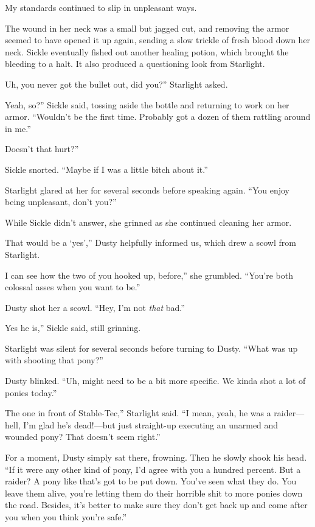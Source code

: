 My standards continued to slip in unpleasant ways.

The wound in her neck was a small but jagged cut, and removing the armor seemed to have opened it up again, sending a slow trickle of fresh blood down her neck. Sickle eventually fished out another healing potion, which brought the bleeding to a halt. It also produced a questioning look from Starlight.

\leavevmode{}Uh, you never got the bullet out, did you?” Starlight asked.

\leavevmode{}Yeah, so?” Sickle said, tossing aside the bottle and returning to work on her armor. “Wouldn’t be the first time. Probably got a dozen of them rattling around in me.”

\leavevmode{}Doesn’t that hurt?”

Sickle snorted. “Maybe if I was a little bitch about it.”

Starlight glared at her for several seconds before speaking again. “You enjoy being unpleasant, don’t you?”

While Sickle didn’t answer, she grinned as she continued cleaning her armor.

\leavevmode{}That would be a ‘yes’,” Dusty helpfully informed us, which drew a scowl from Starlight.

\leavevmode{}I can see how the two of you hooked up, before,” she grumbled. “You’re both colossal asses when you want to be.”

Dusty shot her a scowl. “Hey, I’m not \textit{that} bad.”

\leavevmode{}Yes he is,” Sickle said, still grinning.

Starlight was silent for several seconds before turning to Dusty. “What was up with shooting that pony?”

Dusty blinked. “Uh, might need to be a bit more specific. We kinda shot a lot of ponies today.”

\leavevmode{}The one in front of Stable-Tec,” Starlight said. “I mean, yeah, he was a raider—hell, I’m glad he’s dead!—but just straight-up executing an unarmed and wounded pony? That doesn’t seem right.”

For a moment, Dusty simply sat there, frowning. Then he slowly shook his head. “If it were any other kind of pony, I’d agree with you a hundred percent. But a raider? A pony like that’s got to be put down. You’ve seen what they do. You leave them alive, you’re letting them do their horrible shit to more ponies down the road. Besides, it’s better to make sure they don’t get back up and come after you when you think you’re safe.”

